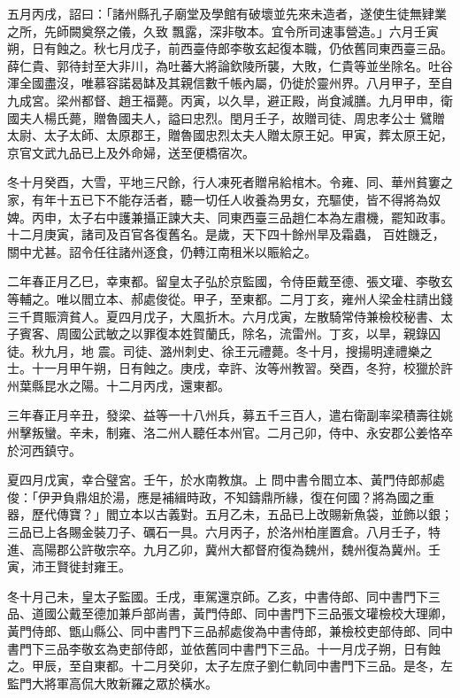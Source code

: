 \begin{pinyinscope}
 五月丙戌，詔曰：「諸州縣孔子廟堂及學館有破壞並先來未造者，遂使生徒無肄業之所，先師闕奠祭之儀，久致
 飄露，深非敬本。宜令所司速事營造。」六月壬寅朔，日有蝕之。秋七月戊子，前西臺侍郎李敬玄起復本職，仍依舊同東西臺三品。薛仁貴、郭待封至大非川，為吐蕃大將論欽陵所襲，大敗，仁貴等並坐除名。吐谷渾全國盡沒，唯慕容諾曷缽及其親信數千帳內屬，仍徙於靈州界。八月甲子，至自九成宮。梁州都督、趙王福薨。丙寅，以久旱，避正殿，尚食減膳。九月甲申，衛國夫人楊氏薨，贈魯國夫人，謚曰忠烈。閏月壬子，故贈司徒、周忠孝公士
 鷿贈太尉、太子太師、太原郡王，贈魯國忠烈太夫人贈太原王妃。甲寅，葬太原王妃，京官文武九品已上及外命婦，送至便橋宿次。



 冬十月癸酉，大雪，平地三尺餘，行人凍死者贈帛給棺木。令雍、同、華州貧窶之家，有年十五已下不能存活者，聽一切任人收養為男女，充驅使，皆不得將為奴婢。丙申，太子右中護兼攝正諫大夫、同東西臺三品趙仁本為左肅機，罷知政事。十二月庚寅，諸司及百官各復舊名。是歲，天下四十餘州旱及霜蟲，
 百姓饑乏，關中尤甚。詔令任往諸州逐食，仍轉江南租米以賑給之。



 二年春正月乙巳，幸東都。留皇太子弘於京監國，令侍臣戴至德、張文瓘、李敬玄等輔之。唯以閻立本、郝處俊從。甲子，至東都。二月丁亥，雍州人梁金柱請出錢三千貫賑濟貧人。夏四月戊子，大風折木。六月戊寅，左散騎常侍兼檢校秘書、太子賓客、周國公武敏之以罪復本姓賀蘭氏，除名，流雷州。丁亥，以旱，親錄囚徒。秋九月，地
 震。司徒、潞州刺史、徐王元禮薨。冬十月，搜揚明達禮樂之士。十一月甲午朔，日有蝕之。庚戌，幸許、汝等州教習。癸酉，冬狩，校獵於許州葉縣昆水之陽。十二月丙戌，還東都。



 三年春正月辛丑，發梁、益等一十八州兵，募五千三百人，遣右衛副率梁積壽往姚州擊叛蠻。辛未，制雍、洛二州人聽任本州官。二月己卯，侍中、永安郡公姜恪卒於河西鎮守。



 夏四月戊寅，幸合璧宮。壬午，於水南教旗。上
 問中書令閻立本、黃門侍郎郝處俊：「伊尹負鼎俎於湯，應是補緝時政，不知鑄鼎所緣，復在何國？將為國之重器，歷代傳寶？」閻立本以古義對。五月乙未，五品已上改賜新魚袋，並飾以銀；三品已上各賜金裝刀子、礪石一具。六月丙子，於洛州柏崖置倉。八月壬子，特進、高陽郡公許敬宗卒。九月乙卯，冀州大都督府復為魏州，魏州復為冀州。壬寅，沛王賢徙封雍王。



 冬十月己未，皇太子監國。壬戌，車駕還京師。乙亥，中書侍郎、同中書門下三
 品、道國公戴至德加兼戶部尚書，黃門侍郎、同中書門下三品張文瓘檢校大理卿，黃門侍郎、甑山縣公、同中書門下三品郝處俊為中書侍郎，兼檢校吏部侍郎、同中書門下三品李敬玄為吏部侍郎，並依舊同中書門下三品。十一月戊子朔，日有蝕之。甲辰，至自東都。十二月癸卯，太子左庶子劉仁軌同中書門下三品。是冬，左監門大將軍高侃大敗新羅之眾於橫水。




\end{pinyinscope}
